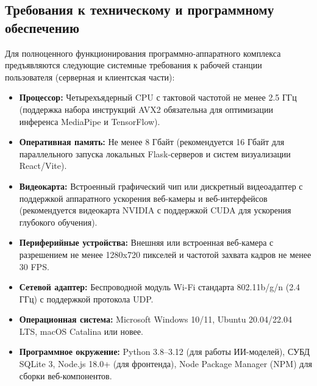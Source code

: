 \documentclass[utf8, russian]{eskdtext}
\begin{document}
\subsection{Требования к техническому и программному обеспечению}
Для полноценного функционирования программно-аппаратного комплекса предъявляются следующие системные требования к рабочей станции пользователя (серверная и клиентская части):
\begin{itemize}
    \item \textbf{Процессор:} Четырехъядерный CPU с тактовой частотой не менее 2.5 ГГц (поддержка набора инструкций AVX2 обязательна для оптимизации инференса MediaPipe и TensorFlow).
    \item \textbf{Оперативная память:} Не менее 8 Гбайт (рекомендуется 16 Гбайт для параллельного запуска локальных Flask-серверов и систем визуализации React/Vite).
    \item \textbf{Видеокарта:} Встроенный графический чип или дискретный видеоадаптер с поддержкой аппаратного ускорения веб-камеры и веб-интерфейсов (рекомендуется видеокарта NVIDIA с поддержкой CUDA для ускорения глубокого обучения).
    \item \textbf{Периферийные устройства:} Внешняя или встроенная веб-камера с разрешением не менее 1280x720 пикселей и частотой захвата кадров не менее 30 FPS.
    \item \textbf{Сетевой адаптер:} Беспроводной модуль Wi-Fi стандарта 802.11b/g/n (2.4 ГГц) с поддержкой протокола UDP.
    \item \textbf{Операционная система:} Microsoft Windows 10/11, Ubuntu 20.04/22.04 LTS, macOS Catalina или новее.
    \item \textbf{Программное окружение:} Python 3.8--3.12 (для работы ИИ-моделей), СУБД SQLite 3, Node.js 18.0+ (для фронтенда), Node Package Manager (NPM) для сборки веб-компонентов.
\end{itemize}
\end{document}
